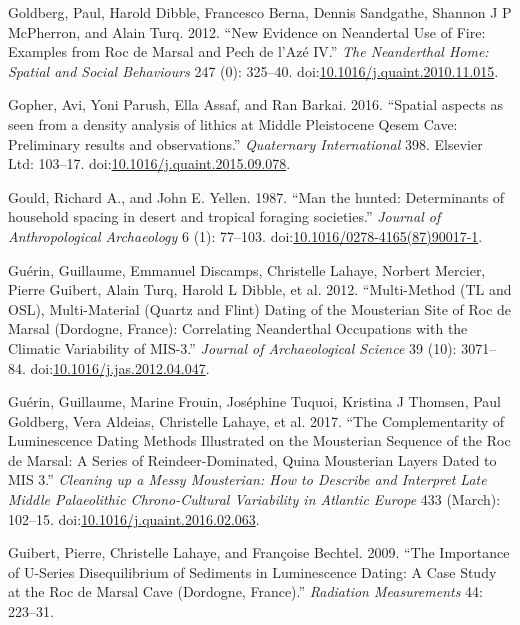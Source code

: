 \documentclass[smallextended]{svjour3}       %
\begin{document}
\hypertarget{ref-goldberg_new_2012}{}
Goldberg, Paul, Harold Dibble, Francesco Berna, Dennis Sandgathe,
Shannon J P McPherron, and Alain Turq. 2012. ``New Evidence on
Neandertal Use of Fire: Examples from Roc de Marsal and Pech de l'Azé
IV.'' \emph{The Neanderthal Home: Spatial and Social Behaviours} 247
(0): 325--40.
doi:\href{https://doi.org/10.1016/j.quaint.2010.11.015}{10.1016/j.quaint.2010.11.015}.

\hypertarget{ref-Gopher2016}{}
Gopher, Avi, Yoni Parush, Ella Assaf, and Ran Barkai. 2016. ``Spatial
aspects as seen from a density analysis of lithics at Middle Pleistocene
Qesem Cave: Preliminary results and observations.'' \emph{Quaternary
International} 398. Elsevier Ltd: 103--17.
doi:\href{https://doi.org/10.1016/j.quaint.2015.09.078}{10.1016/j.quaint.2015.09.078}.

\hypertarget{ref-Gould1987}{}
Gould, Richard A., and John E. Yellen. 1987. ``Man the hunted:
Determinants of household spacing in desert and tropical foraging
societies.'' \emph{Journal of Anthropological Archaeology} 6 (1):
77--103.
doi:\href{https://doi.org/10.1016/0278-4165(87)90017-1}{10.1016/0278-4165(87)90017-1}.

\hypertarget{ref-guerin_multi-method_2012}{}
Guérin, Guillaume, Emmanuel Discamps, Christelle Lahaye, Norbert
Mercier, Pierre Guibert, Alain Turq, Harold L Dibble, et al. 2012.
``Multi-Method (TL and OSL), Multi-Material (Quartz and Flint) Dating of
the Mousterian Site of Roc de Marsal (Dordogne, France): Correlating
Neanderthal Occupations with the Climatic Variability of MIS-3.''
\emph{Journal of Archaeological Science} 39 (10): 3071--84.
doi:\href{https://doi.org/10.1016/j.jas.2012.04.047}{10.1016/j.jas.2012.04.047}.

\hypertarget{ref-guerin_complementarity_2017}{}
Guérin, Guillaume, Marine Frouin, Joséphine Tuquoi, Kristina J Thomsen,
Paul Goldberg, Vera Aldeias, Christelle Lahaye, et al. 2017. ``The
Complementarity of Luminescence Dating Methods Illustrated on the
Mousterian Sequence of the Roc de Marsal: A Series of
Reindeer-Dominated, Quina Mousterian Layers Dated to MIS 3.''
\emph{Cleaning up a Messy Mousterian: How to Describe and Interpret Late
Middle Palaeolithic Chrono-Cultural Variability in Atlantic Europe} 433
(March): 102--15.
doi:\href{https://doi.org/10.1016/j.quaint.2016.02.063}{10.1016/j.quaint.2016.02.063}.

\hypertarget{ref-guibert_importance_2009}{}
Guibert, Pierre, Christelle Lahaye, and Françoise Bechtel. 2009. ``The
Importance of U-Series Disequilibrium of Sediments in Luminescence
Dating: A Case Study at the Roc de Marsal Cave (Dordogne, France).''
\emph{Radiation Measurements} 44: 223--31.
\end{document}
